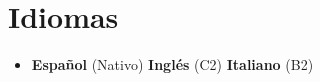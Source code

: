 \documentclass[letterpaper,11pt]{article}
\newcommand{\resumeSubHeadingListStart}{\begin{itemize}[leftmargin=*]}
\newcommand{\resumeSubHeadingListEnd}{\end{itemize}}
\begin{document}
	\section{Idiomas}
	\resumeSubHeadingListStart
	\item{
		\textbf{Español}{ (Nativo)} \quad
		\textbf{Inglés}{ (C2)} \quad
		\textbf{Italiano}{ (B2)}
	}
	\resumeSubHeadingListEnd
	
\end{document}
